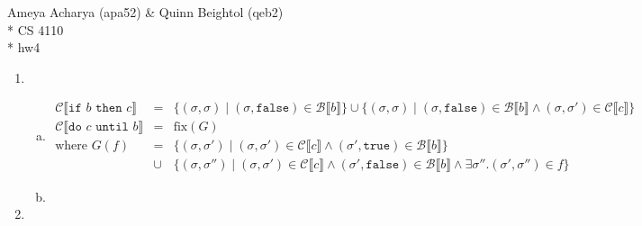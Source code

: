 \documentclass[10pt, oneside]{article}
\begin{document}
\noindent Ameya Acharya (apa52) \& Quinn Beightol (qeb2) \\*
\noindent CS 4110 \\*
\noindent hw4

\begin{enumerate}[1.]
  \item
  \begin{enumerate}[(a)] 
    \item 
    \begin{eqnarray*}
      \mathcal{C}\llbracket \texttt{if } b \texttt{ then } c \rrbracket & = & 
        \{ (\sigma, \sigma) \mid (\sigma, \texttt{false}) \in \mathcal{B}
                                                         \llbracket b \rrbracket \}
        \cup \{ (\sigma, \sigma) \mid (\sigma, \texttt{false}) \in \mathcal{B}
          \llbracket b \rrbracket \wedge (\sigma, \sigma') \in \mathcal{C}
                                                       \llbracket c \rrbracket \}\\
      \mathcal{C} \llbracket \texttt{do } c \texttt{ until } b  \rrbracket 
        & = & \text{fix}(G)\\
      \text{where } G(f) & = &
  				\{ (\sigma, \sigma') \mid (\sigma, \sigma') \in \mathcal{C} 
				                                              \llbracket c \rrbracket
		 \wedge (\sigma', \texttt{true}) \in \mathcal{B} \llbracket b \rrbracket \} \\
				& \cup & \{ (\sigma, \sigma'') \mid 
				            (\sigma, \sigma')  \in \mathcal{C} \llbracket c \rrbracket 
				     \wedge (\sigma', \texttt{false})\in \mathcal{B} \llbracket b \rrbracket
				     \wedge \exists \sigma''. (\sigma', \sigma'') \in f \}
    \end{eqnarray*}
    \item 
  \end{enumerate}

  \item
  \begin{enumerate} [(a)]


\end{enumerate}
\end{enumerate}
\end{document}
